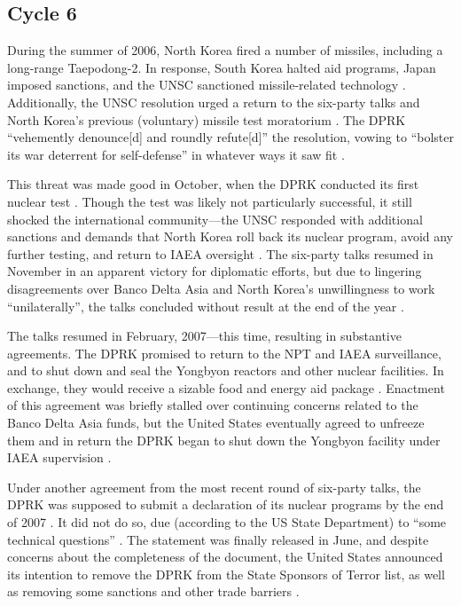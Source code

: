 \subsection{Cycle 6}

During the summer of 2006, North Korea fired a number of missiles, including a long-range Taepodong-2. In response, South Korea halted aid programs, Japan imposed sanctions, and the UNSC sanctioned missile-related technology \cite{greenlees}. Additionally, the UNSC resolution urged a return to the six-party talks and North Korea's previous (voluntary) missile test moratorium \cite{unsc06}. The DPRK ``vehemently denounce[d] and roundly refute[d]'' the resolution, vowing to ``bolster its war deterrent for self-defense'' in whatever ways it saw fit \cite{kcna5}.

This threat was made good in October, when the DPRK conducted its first nuclear test \cite{nti15}. Though the test was likely not particularly successful, it still shocked the international community---the UNSC responded with additional sanctions and demands that North Korea roll back its nuclear program, avoid any further testing, and return to IAEA oversight \cite{unsc1718}. The six-party talks resumed in November in an apparent victory for diplomatic efforts, but due to lingering disagreements over Banco Delta Asia and North Korea's unwillingness to work ``unilaterally'', the talks concluded without result at the end of the year \cite{davenport}.

The talks resumed in February, 2007---this time, resulting in substantive agreements. The DPRK promised to return to the NPT and IAEA surveillance, and to shut down and seal the Yongbyon reactors and other nuclear facilities. In exchange, they would receive a sizable food and energy aid package \cite{js5}. Enactment of this agreement was briefly stalled over continuing concerns related to the Banco Delta Asia funds, but the United States eventually agreed to unfreeze them and in return the DPRK began to shut down the Yongbyon facility under IAEA supervision \cite{davenport}.

Under another agreement from the most recent round of six-party talks, the DPRK was supposed to submit a declaration of its nuclear programs by the end of 2007 \cite{js6}. It did not do so, due (according to the US State Department) to ``some technical questions'' \cite{seanm}. The statement was finally released in June, and despite concerns about the completeness of the document, the United States announced its intention to remove the DPRK from the State Sponsors of Terror list, as well as removing some sanctions and other trade barriers \cite{nti15}.


